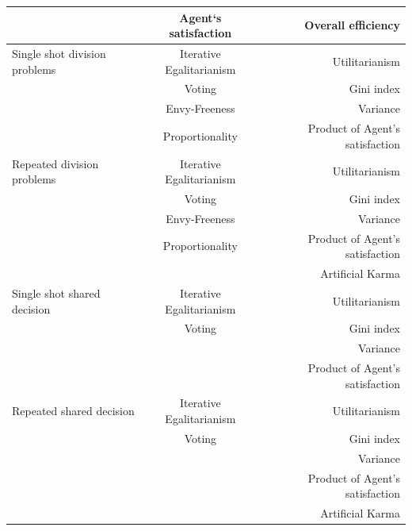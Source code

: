 \documentclass[german, a4paper, 11pt, oneside]{scrbook}
\begin{document}
\begin{center}
\begin{tabular}[h]{l|c|r}
 & Agent`s satisfaction & Overall efficiency \\
\hline
Single shot division problems & Iterative Egalitarianism & Utilitarianism \\
 & Voting & Gini index \\
 & Envy-Freeness & Variance \\
 & Proportionality & Product of Agent's satisfaction \\
\hline
Repeated division problems & Iterative Egalitarianism & Utilitarianism \\
 & Voting & Gini index \\
 & Envy-Freeness & Variance \\
& Proportionality & Product of Agent's satisfaction\\
& & Artificial Karma\\
\hline
Single shot shared decision & Iterative Egalitarianism & Utilitarianism \\
 & Voting & Gini index \\
  & & Variance \\
& & Product of Agent's satisfaction\\

\hline
Repeated shared decision & Iterative Egalitarianism & Utilitarianism \\
 & Voting & Gini index \\
 &  & Variance \\
& & Product of Agent's satisfaction\\
& & Artificial Karma
\end{tabular}
\end{center}
\end{document}
